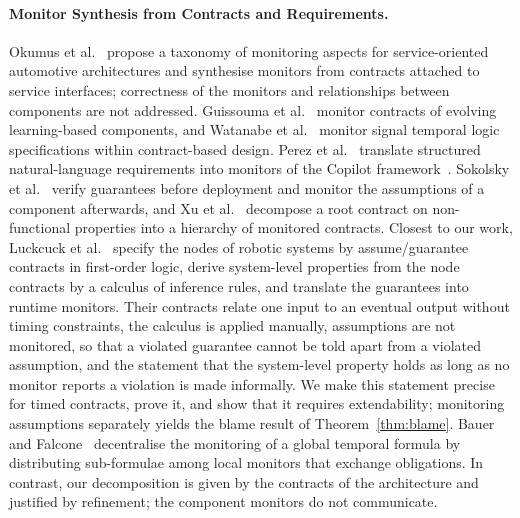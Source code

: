 \paragraph{Monitor Synthesis from Contracts and Requirements.} Okumus et al.~\cite{Okumus2025} propose a taxonomy of monitoring aspects for service-oriented automotive architectures and synthesise monitors from contracts attached to service interfaces; correctness of the monitors and relationships between components are not addressed. Guissouma et al.~\cite{Guissouma2023} monitor contracts of evolving learning-based components, and Watanabe et al.~\cite{Watanabe2018} monitor signal temporal logic specifications within contract-based design. Perez et al.~\cite{Perez2022} translate structured natural-language requirements into monitors of the Copilot framework~\cite{Pike2013}. Sokolsky et al.~\cite{Sokolsky2016} verify guarantees before deployment and monitor the assumptions of a component afterwards, and Xu et al.~\cite{Xu2019} decompose a root contract on non-functional properties into a hierarchy of monitored contracts. Closest to our work, Luckcuck et al.~\cite{Luckcuck2022} specify the nodes of robotic systems by assume/guarantee contracts in first-order logic, derive system-level properties from the node contracts by a calculus of inference rules, and translate the guarantees into runtime monitors. Their contracts relate one input to an eventual output without timing constraints, the calculus is applied manually, assumptions are not monitored, so that a violated guarantee cannot be told apart from a violated assumption, and the statement that the system-level property holds as long as no monitor reports a violation is made informally. We make this statement precise for timed contracts, prove it, and show that it requires extendability; monitoring assumptions separately yields the blame result of Theorem~\ref{thm:blame}. Bauer and Falcone~\cite{BauerFalcone2016} decentralise the monitoring of a global temporal formula by distributing sub-formulae among local monitors that exchange obligations. In contrast, our decomposition is given by the contracts of the architecture and justified by refinement; the component monitors do not communicate.

